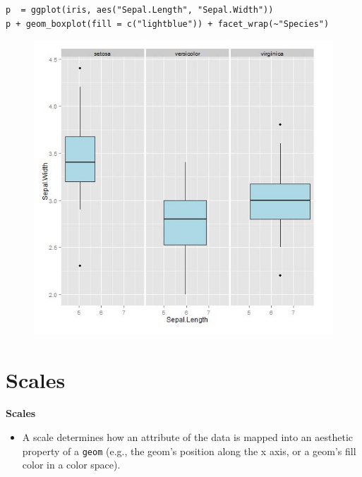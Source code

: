 \documentclass{beamer}
\begin{document}
\begin{frame}[fragile]
	\begin{framed}
	\begin{verbatim}
p  = ggplot(iris, aes("Sepal.Length", "Sepal.Width"))
p + geom_boxplot(fill = c("lightblue")) + facet_wrap(~"Species")

	\end{verbatim}
		
	\end{framed}
\end{frame}



\begin{frame}
	\begin{figure}
		\centering
		\includegraphics[width=0.7\linewidth]{iris-boxplot}
		\caption{}
		\label{fig:iris-boxplot}
	\end{figure}
	
\end{frame}


\section*{Scales}
\begin{frame}
	\Large
	\noindent \textbf{Scales}
	\begin{itemize}
		\item A scale determines how an attribute of the data is mapped into an aesthetic property of a \texttt{geom} (e.g., the geom's position along the x axis, or a geom's fill color in a color space).
	\end{itemize}
	
\end{frame}
\end{document}

